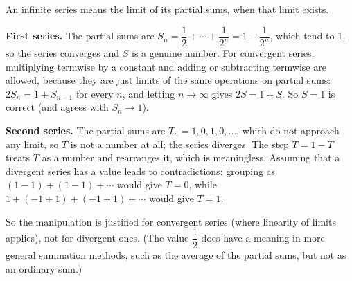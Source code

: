 An infinite series means the limit of its partial sums, when that limit exists.

\textbf{First series.} The partial sums are $S_n=\dfrac{1}{2}+\cdots+\dfrac{1}{2^n}=1-\dfrac{1}{2^n}$, which tend to $1$, so the series converges and $S$ is a genuine number. For convergent series, multiplying termwise by a constant and adding or subtracting termwise are allowed, because they are just limits of the same operations on partial sums: $2S_n=1+S_{n-1}$ for every $n$, and letting $n\to\infty$ gives $2S=1+S$. So $S=1$ is correct (and agrees with $S_n\to1$).

\textbf{Second series.} The partial sums are $T_n=1,0,1,0,\dots$, which do not approach any limit, so $T$ is not a number at all; the series diverges. The step $T=1-T$ treats $T$ as a number and rearranges it, which is meaningless. Assuming that a divergent series has a value leads to contradictions: grouping as $(1-1)+(1-1)+\cdots$ would give $T=0$, while $1+(-1+1)+(-1+1)+\cdots$ would give $T=1$.

So the manipulation is justified for convergent series (where linearity of limits applies), not for divergent ones. (The value $\dfrac{1}{2}$ does have a meaning in more general summation methods, such as the average of the partial sums, but not as an ordinary sum.)
